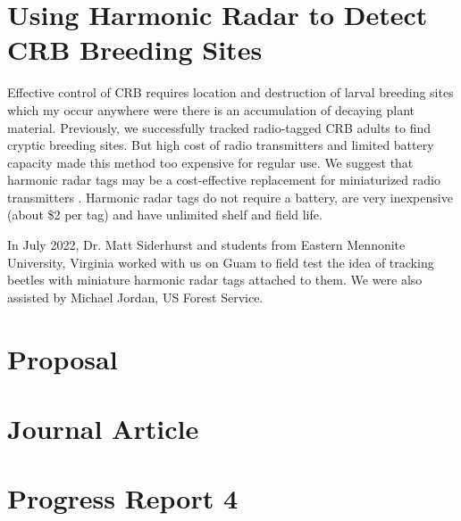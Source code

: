 \documentclass[12pt,letterpaper,english,bibliography=totocnumbered, abstract=on]{scrartcl}
\begin{document}
%
%
%
%
%

\section{Using Harmonic Radar to Detect CRB Breeding Sites}

Effective control of CRB requires location and destruction of larval breeding sites which my occur anywhere were there is an accumulation of decaying plant material. Previously, we successfully tracked radio-tagged CRB adults to find cryptic breeding sites. But high cost of radio transmitters and limited battery capacity made this method too expensive for regular use. We suggest that harmonic radar tags may be a cost-effective replacement for miniaturized radio transmitters \cite{mooreProposalDetectingCoconut2022}. Harmonic radar tags do not require a battery, are very inexpensive (about \$2 per tag) and have unlimited shelf and field life.

In July 2022, Dr. Matt Siderhurst and students from Eastern Mennonite University, Virginia worked with us on Guam to field test the idea of tracking beetles with miniature harmonic radar tags attached to them. We were also assisted by Michael Jordan, US Forest Service.

\newpage

\printbibliography

\begin{appendices}

\section{Proposal}


\section{Journal Article}


\section{Progress Report 4}


\end{appendices}
\end{document}
